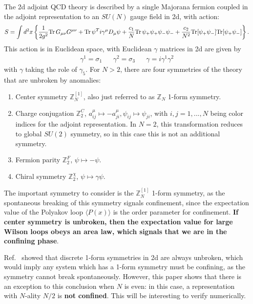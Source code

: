 The 2d adjoint QCD theory is described by a single Majorana fermion coupled in the adjoint representation to an $SU(N)$ gauge field in 2d, with action:
\begin{equation}
	S = \int d^2x \left\{ \frac{1}{2g^2} \mathrm{Tr}\, G_{\mu\nu} G^{\mu\nu} + \mathrm{Tr}\, \psi^T i\gamma^\mu D_\mu \psi + \frac{c_1}{N} \mathrm{Tr}\, \psi_+ \psi_+ \psi_- \psi_- + \frac{c_2}{N^2} \mathrm{Tr}[\psi_+ \psi_-] \mathrm{Tr}[\psi_+ \psi_-]\right\}.
\end{equation}
This action is in Euclidean space, with Euclidean $\gamma$ matrices in 2d are given by
\begin{align}
	\gamma^1 = \sigma_1 && \gamma^2 = \sigma_3 && \gamma = i\gamma^1\gamma^2
\end{align}
with $\gamma$ taking the role of $\gamma_5$. For $N > 2$, there are four symmetries of the theory that are unbroken by anomalies:
\begin{enumerate}
	\item Center symmetry $\mathbb Z_N^{[1]}$, also just referred to as $\mathbb Z_N$ 1-form symmetry. 
	\item Charge conjugation $\mathbb Z_2^C$, $a_{ij}^\mu\mapsto -a_{ji}^\mu, \psi_{ij}\mapsto \psi_{ji}$, with $i, j = 1, ..., N$ being color indices for the adjoint representation. In $N = 2$, this transformation reduces to global $SU(2)$ symmetry, so in this case this is not an additional symmetry. 
	\item Fermion parity $\mathbb Z_2^F$, $\psi\mapsto -\psi$. 
	\item Chiral symmetry $\mathbb Z_2^\chi$, $\psi\mapsto \gamma \psi$. 
\end{enumerate}
The important symmetry to consider is the $\mathbb Z_N^{[1]}$ 1-form symmetry, as the spontaneous breaking of this symmetry signals confinement, since the expectation value of the Polyakov loop $\langle P(x)\rangle$ is the order parameter for confinement. \textbf{If center symmetry is unbroken, then the expectation value for large Wilson loops obeys an area law, which signals that we are in the confining phase}. 

Ref.~\cite{Gaiotto:2014kfa} showed that discrete 1-form symmetries in 2d are always unbroken, which would imply any system which has a 1-form symmetry must be confining, as the symmetry cannot break spontaneously. However, this paper shows that there is an exception to this conclusion when $N$ is even: in this case, a representation with $N$-ality $N / 2$ is \textbf{not confined}. This will be interesting to verify numerically. 

